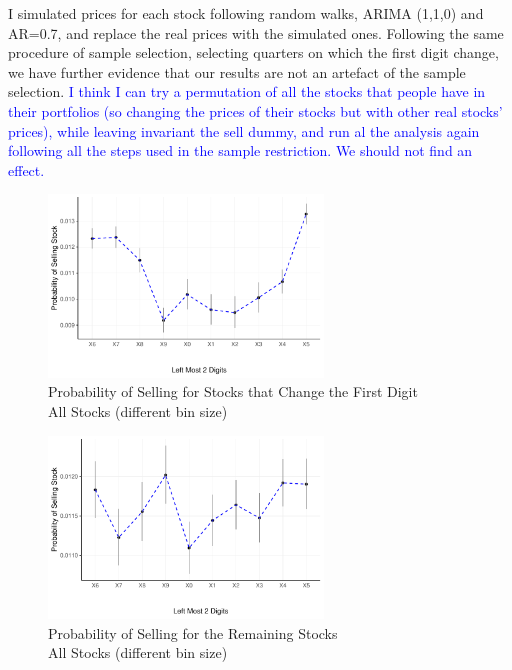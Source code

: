 I simulated prices for each stock following random walks, ARIMA (1,1,0) and AR=0.7,  and replace the real prices with the simulated ones. Following the same procedure of sample selection, selecting quarters on which the first digit change, we have further evidence that our results are not an artefact of the sample selection. \textcolor{blue}{I think I can try a permutation of all the stocks that people have in their portfolios (so changing the prices of their stocks but with other real stocks' prices), while leaving invariant the sell dummy, and run al the analysis again following all the steps used in the sample restriction. We should not find an effect.}



\begin{figure}[hbt!]
	\centering%
	\caption{Probability of Selling  for Stocks that Change the First Digit \\ All Stocks (different bin size)}%
	\label{fig:}%
	\includegraphics[width=0.65\textwidth]{figures/Left2increase_probCI_random.pdf}
	\fignote{}
\end{figure}


\begin{figure}[hbt!]
	\centering%
	\caption{Probability of Selling  for the Remaining Stocks \\ All Stocks (different bin size)}%
	\label{fig:}%
	\includegraphics[width=0.65\textwidth]{figures/Left2decrease_probCI_random.pdf}
	\fignote{}
\end{figure}

